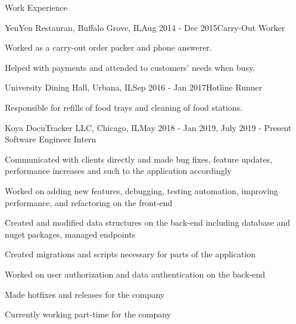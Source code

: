 \documentclass{resume}
\begin{document}
\begin{rSection}{Work Experience}

\begin{rSubsection}{YenYen Restauran, Buffalo Grove, IL}{Aug 2014 - Dec 2015}{Carry-Out Worker}{}

    \item Worked as a carry-out order packer and phone answerer.
    \item Helped with payments and attended to customers' needs when busy.

\end{rSubsection}

\begin{rSubsection}{University Dining Hall, Urbana, IL}{Sep 2016 - Jan 2017}{Hotline Runner}{}

    \item Responsible for refills of food trays and cleaning of food stations.

\end{rSubsection}

\begin{rSubsection}{Koya DocuTracker LLC, Chicago, IL}{May 2018 - Jan 2019, July 2019 - Present}
{Software Engineer Intern}

    \item Communicated with clients directly and made bug fixes, feature updates, performance increases and such to the application accordingly
    \item Worked on adding new features, debugging, testing automation, improving performance, and refactoring on the front-end
    \item Created and modified data structures on the back-end including database and nuget packages, managed endpoints
    \item Created migrations and scripts necessary for parts of the application
    \item Worked on user authorization and data authentication on the back-end
    \item Made hotfixes and releases for the company
    \item Currently working part-time for the company

\end{rSubsection}

\end{rSection}
\end{document}
